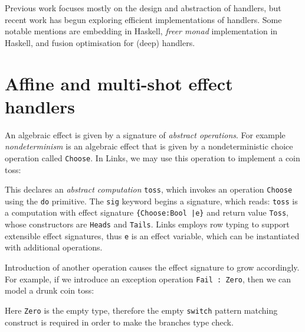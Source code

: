 \documentclass[preprint,numbers]{sigplanconf}
\newcommand{\msgbox}[2]{{%
  \par\noindent\small\color{red}%
  \framebox{\parbox{\dimexpr\linewidth-2\fboxsep-2\fboxrule}{\textbf{#1:} #2}}%
}}
\newcommand{\kc}[1]{\msgbox{KC}{#1}}
\begin{document}

Previous work focuses mostly on the design and abstraction of
handlers, but recent work has begun exploring efficient
implementations of handlers. Some notable mentions are
\citet{Kammar2013} embedding in Haskell, \citet{Kiselyov2015}
\emph{freer monad} implementation in Haskell, and \citet{Wu2015}
fusion optimisation for (deep) handlers.

\section{Affine and multi-shot effect handlers}
An algebraic effect is given by a signature of \emph{abstract
  operations}. For example \emph{nondeterminism} is an algebraic
effect that is given by a nondeterministic choice operation called
\lstinline$Choose$. In Links, we may use this operation to implement a
coin toss:
%

%
This declares an \emph{abstract computation} \lstinline$toss$, which
invokes an operation \lstinline$Choose$ using the \lstinline$do$
primitive.  The \lstinline$sig$ keyword begins a signature, which
reads: \lstinline$toss$ is a computation with effect signature
\lstinline${Choose:Bool |e}$ and return value \lstinline$Toss$, whose
constructors are \lstinline$Heads$ and \lstinline$Tails$.  Links
employs row typing to support extensible effect signatures, thus
\lstinline$e$ is an effect variable, which can be instantiated with
additional operations.

Introduction of another operation causes the effect signature to grow
accordingly. For example, if we introduce an exception operation
\lstinline$Fail : Zero$, then we can model a drunk coin toss:
%

%
Here \lstinline$Zero$ is the empty type, therefore the empty
\lstinline$switch$ pattern matching construct is required in order to
make the branches type check.
\end{document}

